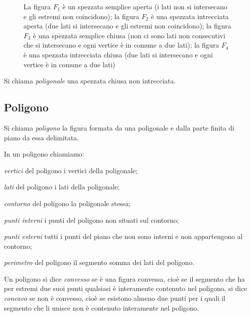 \begin{inaccessibleblock}
 \begin{figure}[htb]
\centering
\caption{La figura $F_1$ è un spezzata semplice aperta (i lati non si 
intersecano e gli estremi non coincidono); la figura $F_2$ è una 
spezzata intrecciata aperta (due lati si intersecano e gli estremi 
non coincidono); la figura $F_3$ è una spezzata semplice chiusa (non 
ci sono lati non consecutivi che si intersecano e ogni vertice è in 
comune a due lati); la figura $F_4$ è una spezzata intrecciata chiusa 
(due lati si intersecano e ogni vertice è in comune a due lati)}
\end{figure}
\end{inaccessibleblock}

\begin{definizione}
Si chiama \emph{poligonale} una spezzata chiusa non intrecciata.
\end{definizione}

\subsection{Poligono}

\begin{definizione}
Si chiama \emph{poligono} la figura formata da una poligonale e dalla 
parte finita di piano da essa delimitata.
\end{definizione}

\begin{definizione}
In un poligono chiamiamo:
\begin{itemize*}
\item \emph{vertici} del poligono i vertici della poligonale;
\item \emph{lati} del poligono i lati della poligonale;
\item \emph{contorno} del poligono la poligonale stessa;
\item \emph{punti interni} i punti del poligono non situati sul 
contorno;
\item \emph{punti esterni} tutti i punti del piano che non sono 
interni e non appartengono al contorno;
\item \emph{perimetro} del poligono il segmento somma dei lati del 
poligono.
\end{itemize*}
\end{definizione}

\begin{definizione}
Un poligono si dice \emph{convesso} se è una figura convessa, cioè se 
il segmento che ha per estremi due suoi punti qualsiasi è interamente 
contenuto nel poligono, si dice \emph{concavo} se non è convesso, 
cioè se esistono almeno due punti per i quali il segmento che li 
unisce non è contenuto interamente nel poligono.
\end{definizione}


